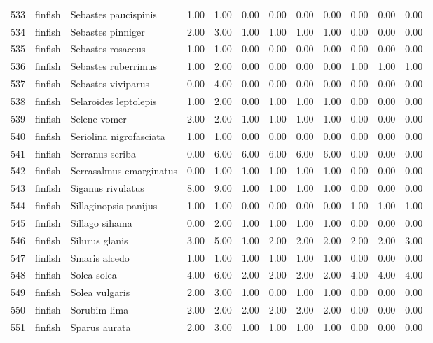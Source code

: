 \begin{table}[ht]
\begin{tabular}{rllrrrrrrrrr}
  533 & finfish & Sebastes paucispinis & 1.00 & 1.00 & 0.00 & 0.00 & 0.00 & 0.00 & 0.00 & 0.00 & 0.00 \\ 
  534 & finfish & Sebastes pinniger & 2.00 & 3.00 & 1.00 & 1.00 & 1.00 & 1.00 & 0.00 & 0.00 & 0.00 \\ 
  535 & finfish & Sebastes rosaceus & 1.00 & 1.00 & 0.00 & 0.00 & 0.00 & 0.00 & 0.00 & 0.00 & 0.00 \\ 
  536 & finfish & Sebastes ruberrimus & 1.00 & 2.00 & 0.00 & 0.00 & 0.00 & 0.00 & 1.00 & 1.00 & 1.00 \\ 
  537 & finfish & Sebastes viviparus & 0.00 & 4.00 & 0.00 & 0.00 & 0.00 & 0.00 & 0.00 & 0.00 & 0.00 \\ 
  538 & finfish & Selaroides leptolepis & 1.00 & 2.00 & 0.00 & 1.00 & 1.00 & 1.00 & 0.00 & 0.00 & 0.00 \\ 
  539 & finfish & Selene vomer & 2.00 & 2.00 & 1.00 & 1.00 & 1.00 & 1.00 & 0.00 & 0.00 & 0.00 \\ 
  540 & finfish & Seriolina nigrofasciata & 1.00 & 1.00 & 0.00 & 0.00 & 0.00 & 0.00 & 0.00 & 0.00 & 0.00 \\ 
  541 & finfish & Serranus scriba & 0.00 & 6.00 & 6.00 & 6.00 & 6.00 & 6.00 & 0.00 & 0.00 & 0.00 \\ 
  542 & finfish & Serrasalmus emarginatus & 0.00 & 1.00 & 1.00 & 1.00 & 1.00 & 1.00 & 0.00 & 0.00 & 0.00 \\ 
  543 & finfish & Siganus rivulatus & 8.00 & 9.00 & 1.00 & 1.00 & 1.00 & 1.00 & 0.00 & 0.00 & 0.00 \\ 
  544 & finfish & Sillaginopsis panijus & 1.00 & 1.00 & 0.00 & 0.00 & 0.00 & 0.00 & 1.00 & 1.00 & 1.00 \\ 
  545 & finfish & Sillago sihama & 0.00 & 2.00 & 1.00 & 1.00 & 1.00 & 1.00 & 0.00 & 0.00 & 0.00 \\ 
  546 & finfish & Silurus glanis & 3.00 & 5.00 & 1.00 & 2.00 & 2.00 & 2.00 & 2.00 & 2.00 & 3.00 \\ 
  547 & finfish & Smaris alcedo & 1.00 & 1.00 & 1.00 & 1.00 & 1.00 & 1.00 & 0.00 & 0.00 & 0.00 \\ 
  548 & finfish & Solea solea & 4.00 & 6.00 & 2.00 & 2.00 & 2.00 & 2.00 & 4.00 & 4.00 & 4.00 \\ 
  549 & finfish & Solea vulgaris & 2.00 & 3.00 & 1.00 & 0.00 & 1.00 & 1.00 & 0.00 & 0.00 & 0.00 \\ 
  550 & finfish & Sorubim lima & 2.00 & 2.00 & 2.00 & 2.00 & 2.00 & 2.00 & 0.00 & 0.00 & 0.00 \\ 
  551 & finfish & Sparus aurata & 2.00 & 3.00 & 1.00 & 1.00 & 1.00 & 1.00 & 0.00 & 0.00 & 0.00 \\ 

\end{tabular}
\end{table}
